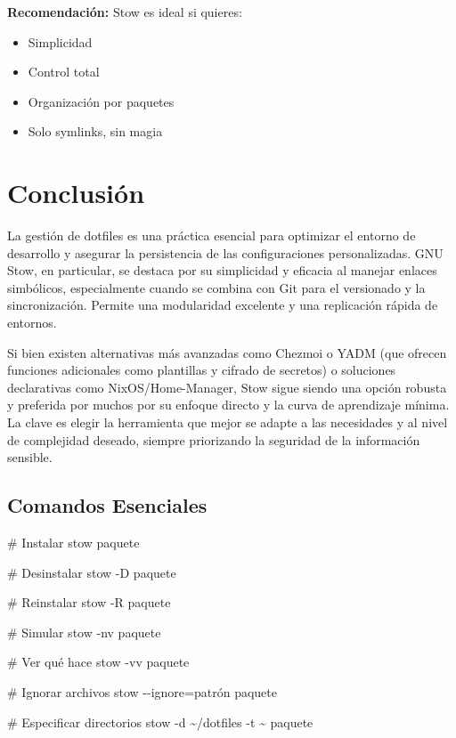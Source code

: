 \documentclass[
  doc,
  floatsintext,
  longtable,
  a4paper,
  nolmodern,
  notxfonts,
  notimes,
  12pt,
  colorlinks=true,linkcolor=blue,citecolor=blue,urlcolor=blue]{apa7}
\newenvironment{Shaded}{\begin{snugshade}}{\end{snugshade}}
\newcommand{\AttributeTok}[1]{\textcolor[rgb]{0.40,0.45,0.13}{#1}}
\newcommand{\CommentTok}[1]{\textcolor[rgb]{0.37,0.37,0.37}{#1}}
\newcommand{\ExtensionTok}[1]{\textcolor[rgb]{0.00,0.23,0.31}{#1}}
\newcommand{\NormalTok}[1]{\textcolor[rgb]{0.00,0.23,0.31}{#1}}
\newcommand{\OperatorTok}[1]{\textcolor[rgb]{0.37,0.37,0.37}{#1}}
\newcommand{\StringTok}[1]{\textcolor[rgb]{0.13,0.47,0.30}{#1}}
\providecommand{\tightlist}{%
  \setlength{\itemsep}{0pt}\setlength{\parskip}{0pt}}
\begin{document}
\textbf{Recomendación:} Stow es ideal si quieres:

\begin{itemize}
\tightlist
\item
  Simplicidad
\item
  Control total
\item
  Organización por paquetes
\item
  Solo symlinks, sin magia
\end{itemize}

\section{Conclusión}\label{conclusiuxf3n}

La gestión de dotfiles es una práctica esencial para optimizar el
entorno de desarrollo y asegurar la persistencia de las configuraciones
personalizadas. GNU Stow, en particular, se destaca por su simplicidad y
eficacia al manejar enlaces simbólicos, especialmente cuando se combina
con Git para el versionado y la sincronización. Permite una modularidad
excelente y una replicación rápida de entornos.

Si bien existen alternativas más avanzadas como Chezmoi o YADM (que
ofrecen funciones adicionales como plantillas y cifrado de secretos) o
soluciones declarativas como NixOS/Home-Manager, Stow sigue siendo una
opción robusta y preferida por muchos por su enfoque directo y la curva
de aprendizaje mínima. La clave es elegir la herramienta que mejor se
adapte a las necesidades y al nivel de complejidad deseado, siempre
priorizando la seguridad de la información sensible.

\subsection{Comandos Esenciales}\label{comandos-esenciales}

\begin{Shaded}
\begin{Highlighting}[]
\CommentTok{\# Instalar}
\ExtensionTok{stow}\NormalTok{ paquete}

\CommentTok{\# Desinstalar}
\ExtensionTok{stow} \AttributeTok{{-}D}\NormalTok{ paquete}

\CommentTok{\# Reinstalar}
\ExtensionTok{stow} \AttributeTok{{-}R}\NormalTok{ paquete}

\CommentTok{\# Simular}
\ExtensionTok{stow} \AttributeTok{{-}nv}\NormalTok{ paquete}

\CommentTok{\# Ver qué hace}
\ExtensionTok{stow} \AttributeTok{{-}vv}\NormalTok{ paquete}

\CommentTok{\# Ignorar archivos}
\ExtensionTok{stow} \AttributeTok{{-}{-}ignore}\OperatorTok{=}\StringTok{\textquotesingle{}patrón\textquotesingle{}}\NormalTok{ paquete}

\CommentTok{\# Especificar directorios}
\ExtensionTok{stow} \AttributeTok{{-}d}\NormalTok{ \textasciitilde{}/dotfiles }\AttributeTok{{-}t}\NormalTok{ \textasciitilde{} paquete}
\end{Highlighting}
\end{Shaded}
\end{document}
